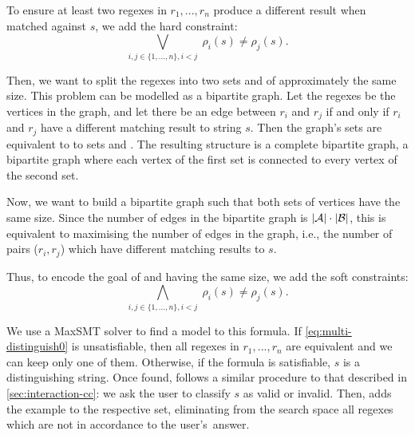 To ensure at least two regexes in \(r_1, ..., r_n\) produce a different result when matched against \(s\), we add the hard constraint:
\begin{equation}\label{eq:multi-distinguish0}
    \bigvee_{i,j \in \{1, ..., n\}, i<j} \; \rho_i(s) \ne \rho_j(s).
\end{equation}

\noindent
Then, we want to split the regexes into two sets  and  of approximately the same size. This problem can be modelled as a bipartite graph. Let the regexes be the vertices in the graph, and let there be an edge between \(r_i\) and \(r_j\) if and only if \(r_i\) and \(r_j\) have a different matching result to string \(s\). Then the graph's sets are equivalent to to sets  and . The resulting structure is a complete bipartite graph, a bipartite graph where each vertex of the first set is connected to every vertex of the second set.

Now, we want to build a bipartite graph such that both sets of vertices have the same size. Since the number of edges in the bipartite graph is \(|{\mathcal{A}}| \cdot |{\mathcal{B}}|\), this is equivalent to maximising the number of edges in the graph, i.e., the number of pairs (\(r_i, r_j\)) which have different matching results to \(s\).

Thus, to encode the goal of  and  having the same size, we add the soft constraints:
\begin{equation}\label{eq:multi-distinguish}
    \bigwedge_{i,j \in \{1, ..., n\}, i<j} \; \rho_i(s) \ne \rho_j(s).
\end{equation}

We use a \ac{MaxSMT} solver to find a model to this formula. If  \eqref{eq:multi-distinguish0} is unsatisfiable, then all regexes in \(r_1, ..., r_n\) are equivalent and we can keep only one of them. Otherwise, if the formula is satisfiable, \(s\) is a distinguishing string. Once found, \Forest{} follows a similar procedure to that described in \autoref{sec:interaction-cc}: we ask the user to classify \(s\) as valid or invalid. Then, \Forest{} adds the example to the respective set, eliminating from the search space all regexes which are not in accordance to the user's~answer. 


